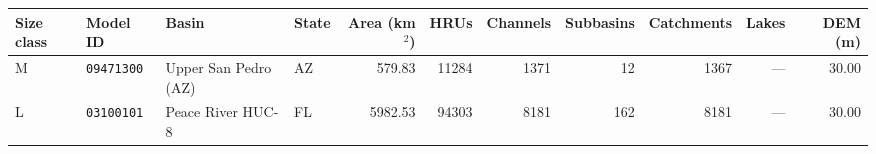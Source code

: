 \begin{tabular}{@{}llllrrrrrrr@{}}
\toprule
Size class & Model ID & Basin & State & Area (km$^2$) & HRUs & Channels & Subbasins & Catchments & Lakes & DEM (m) \\
\midrule
M & \texttt{09471300} & Upper San Pedro (AZ) & AZ & 579.83 & 11284 & 1371 & 12 & 1367 & {---} & 30.00 \\
L & \texttt{03100101} & Peace River HUC-8 & FL & 5982.53 & 94303 & 8181 & 162 & 8181 & {---} & 30.00 \\
\bottomrule
\end{tabular}
